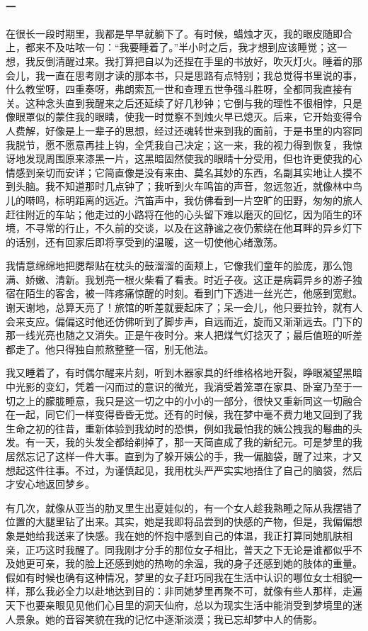 \paragraph*{一}
\par 在很长一段时期里，我都是早早就躺下了。有时候，蜡烛才灭，我的眼皮随即合上，都来不及咕哝一句：“我要睡着了。”半小时之后，我才想到应该睡觉；这一想，我反倒清醒过来。我打算把自以为还捏在手里的书放好，吹灭灯火。睡着的那会儿，我一直在思考刚才读的那本书，只是思路有点特别；我总觉得书里说的事，什么教堂呀，四重奏呀，弗朗索瓦一世和查理五世争强斗胜呀，全都同我直接有关。这种念头直到我醒来之后还延续了好几秒钟；它倒与我的理性不很相悖，只是像眼罩似的蒙住我的眼睛，使我一时觉察不到烛火早已熄灭。后来，它开始变得令人费解，好像是上一辈子的思想，经过还魂转世来到我的面前，于是书里的内容同我脱节，愿不愿意再挂上钩，全凭我自己决定；这一来，我的视力得到恢复，我惊讶地发现周围原来漆黑一片，这黑暗固然使我的眼睛十分受用，但也许更使我的心情感到亲切而安详；它简直像是没有来由、莫名其妙的东西，名副其实地让人摸不到头脑。我不知道那时几点钟了；我听到火车鸣笛的声音，忽远忽近，就像林中鸟儿的啭鸣，标明距离的远近。汽笛声中，我仿佛看到一片空旷的田野，匆匆的旅人赶往附近的车站；他走过的小路将在他的心头留下难以磨灭的回忆，因为陌生的环境，不寻常的行止，不久前的交谈，以及在这静谧之夜仍萦绕在他耳畔的异乡灯下的话别，还有回家后即将享受到的温暖，这一切使他心绪激荡。
\par 我情意绵绵地把腮帮贴在枕头的鼓溜溜的面颊上，它像我们童年的脸庞，那么饱满、娇嫩、清新。我划亮一根火柴看了看表。时近子夜。这正是病羁异乡的游子独宿在陌生的客舍，被一阵疼痛惊醒的时刻。看到门下透进一丝光芒，他感到宽慰。谢天谢地，总算天亮了！旅馆的听差就要起床了；呆一会儿，他只要拉铃，就有人会来支应。偏偏这时他还仿佛听到了脚步声，自远而近，旋而又渐渐远去。门下的那一线光亮也随之又消失。正是午夜时分。来人把煤气灯捻灭了；最后值班的听差都走了。他只得独自煎熬整整一宿，别无他法。
\par 我又睡着了，有时偶尔醒来片刻，听到木器家具的纤维格格地开裂，睁眼凝望黑暗中光影的变幻，凭着一闪而过的意识的微光，我消受着笼罩在家具、卧室乃至于一切之上的朦胧睡意，我只是这一切之中的小小的一部分，很快又重新同这一切融合在一起，同它们一样变得昏昏无觉。还有的时候，我在梦中毫不费力地又回到了我生命之初的往昔，重新体验到我幼时的恐惧，例如我最怕我的姨公拽我的鬈曲的头发。有一天，我的头发全都给剃掉了，那一天简直成了我的新纪元。可是梦里的我居然忘记了这样一件大事。直到为了躲开姨公的手，我一偏脑袋，醒了过来，才又想起这件往事。不过，为谨慎起见，我用枕头严严实实地捂住了自己的脑袋，然后才安心地返回梦乡。
\par 有几次，就像从亚当的肋叉里生出夏娃似的，有一个女人趁我熟睡之际从我摆错了位置的大腿里钻了出来。其实，她是我即将品尝到的快感的产物，但是，我偏偏想象是她给我送来了快感。我在她的怀抱中感到自己的体温，我正打算同她肌肤相亲，正巧这时我醒了。同我刚才分手的那位女子相比，普天之下无论是谁都似乎不及她更可亲，我的脸上还感到她的热吻的余温，我的身子还感到她的肢体的重量。假如有时候也确有这种情况，梦里的女子赶巧同我在生活中认识的哪位女士相貌一样，那么我必全力以赴地达到目的：非同她梦里再聚不可，就像有些人那样，走遍天下也要亲眼见见他们心目里的洞天仙府，总以为现实生活中能消受到梦境里的迷人景象。她的音容笑貌在我的记忆中逐渐淡漠；我已忘却梦中人的倩影。
